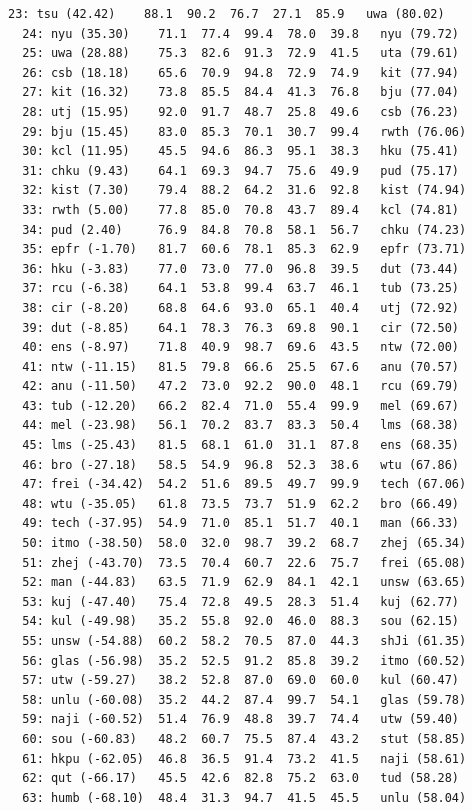 \begin{lstlisting}[caption={Comparing the robust \NetFlows ranking with the THE ranking},label=list:13.11,basicstyle=\ttfamily\scriptsize]
  23: tsu (42.42)    88.1  90.2  76.7  27.1  85.9   uwa (80.02)
  24: nyu (35.30)    71.1  77.4  99.4  78.0  39.8   nyu (79.72)
  25: uwa (28.88)    75.3  82.6  91.3  72.9  41.5   uta (79.61)
  26: csb (18.18)    65.6  70.9  94.8  72.9  74.9   kit (77.94)
  27: kit (16.32)    73.8  85.5  84.4  41.3  76.8   bju (77.04)
  28: utj (15.95)    92.0  91.7  48.7  25.8  49.6   csb (76.23)
  29: bju (15.45)    83.0  85.3  70.1  30.7  99.4   rwth (76.06)
  30: kcl (11.95)    45.5  94.6  86.3  95.1  38.3   hku (75.41)
  31: chku (9.43)    64.1  69.3  94.7  75.6  49.9   pud (75.17)
  32: kist (7.30)    79.4  88.2  64.2  31.6  92.8   kist (74.94)
  33: rwth (5.00)    77.8  85.0  70.8  43.7  89.4   kcl (74.81)
  34: pud (2.40)     76.9  84.8  70.8  58.1  56.7   chku (74.23)
  35: epfr (-1.70)   81.7  60.6  78.1  85.3  62.9   epfr (73.71)
  36: hku (-3.83)    77.0  73.0  77.0  96.8  39.5   dut (73.44)
  37: rcu (-6.38)    64.1  53.8  99.4  63.7  46.1   tub (73.25)
  38: cir (-8.20)    68.8  64.6  93.0  65.1  40.4   utj (72.92)
  39: dut (-8.85)    64.1  78.3  76.3  69.8  90.1   cir (72.50)
  40: ens (-8.97)    71.8  40.9  98.7  69.6  43.5   ntw (72.00)
  41: ntw (-11.15)   81.5  79.8  66.6  25.5  67.6   anu (70.57)
  42: anu (-11.50)   47.2  73.0  92.2  90.0  48.1   rcu (69.79)
  43: tub (-12.20)   66.2  82.4  71.0  55.4  99.9   mel (69.67)
  44: mel (-23.98)   56.1  70.2  83.7  83.3  50.4   lms (68.38)
  45: lms (-25.43)   81.5  68.1  61.0  31.1  87.8   ens (68.35)
  46: bro (-27.18)   58.5  54.9  96.8  52.3  38.6   wtu (67.86)
  47: frei (-34.42)  54.2  51.6  89.5  49.7  99.9   tech (67.06)
  48: wtu (-35.05)   61.8  73.5  73.7  51.9  62.2   bro (66.49)
  49: tech (-37.95)  54.9  71.0  85.1  51.7  40.1   man (66.33)
  50: itmo (-38.50)  58.0  32.0  98.7  39.2  68.7   zhej (65.34)
  51: zhej (-43.70)  73.5  70.4  60.7  22.6  75.7   frei (65.08)
  52: man (-44.83)   63.5  71.9  62.9  84.1  42.1   unsw (63.65)
  53: kuj (-47.40)   75.4  72.8  49.5  28.3  51.4   kuj (62.77)
  54: kul (-49.98)   35.2  55.8  92.0  46.0  88.3   sou (62.15)
  55: unsw (-54.88)  60.2  58.2  70.5  87.0  44.3   shJi (61.35)
  56: glas (-56.98)  35.2  52.5  91.2  85.8  39.2   itmo (60.52)
  57: utw (-59.27)   38.2  52.8  87.0  69.0  60.0   kul (60.47)
  58: unlu (-60.08)  35.2  44.2  87.4  99.7  54.1   glas (59.78)
  59: naji (-60.52)  51.4  76.9  48.8  39.7  74.4   utw (59.40)
  60: sou (-60.83)   48.2  60.7  75.5  87.4  43.2   stut (58.85)
  61: hkpu (-62.05)  46.8  36.5  91.4  73.2  41.5   naji (58.61)
  62: qut (-66.17)   45.5  42.6  82.8  75.2  63.0   tud (58.28)
  63: humb (-68.10)  48.4  31.3  94.7  41.5  45.5   unlu (58.04)

\end{lstlisting}
